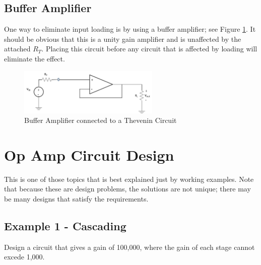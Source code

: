 \documentclass{handout}
\begin{document}
\subsection{Buffer Amplifier}
One way to eliminate input loading is by using a buffer amplifier; see Figure \ref{fig: Buffer}.  It should be obvious that this is a unity gain amplifier and is unaffected by the attached $R_T$.  Placing this circuit before any circuit that is affected by loading will eliminate the effect.

\begin{figure} [h!]
\centering
\includegraphics[width=0.6\textwidth]{Buffer.jpg}
\caption{Buffer Amplifier connected to a Thevenin Circuit}
\label{fig: Buffer}
\end{figure}

\newpage
\clearpage
\pagebreak

\section{Op Amp Circuit Design}
This is one of those topics that is best explained just by working examples. Note that because these are design problems, the solutions are not unique; there may be many designs that satisfy the requirements.

\subsection{Example 1 - Cascading}
Design a circuit that gives a gain of 100,000, where the gain of each stage cannot excede 1,000.

\end{document}
